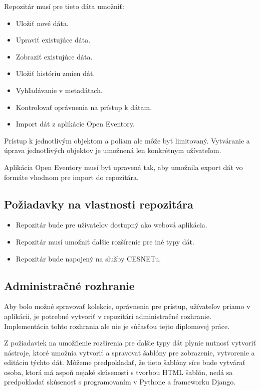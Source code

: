 \documentclass[thesis=M,slovak]{FITthesis}[2013/05/06]
\begin{document}
Repozitár musí pre tieto dáta umožniť:
\begin{itemize}
	\item Uložiť nové dáta.
	\item Upraviť existujúce dáta.
	\item Zobraziť existujúce dáta.
	\item Uložiť históriu zmien dát.
	\item Vyhľadávanie v metadátach.
	\item Kontrolovať oprávnenia na prístup k dátam.
	\item Import dát z aplikácie Open Eventory.
\end{itemize}

Prístup k jednotlivým objektom a poliam ale môže byť limitovaný. Vytváranie a úprava jednotlivých objektov je umožnená len konkrétnym užívateľom.

Aplikácia Open Eventory musí byť upravená tak, aby umožnila export dát vo formáte vhodnom pre import do repozitára.

\subsection{Požiadavky na vlastnosti repozitára}
\begin{itemize}
	\item Repozitár bude pre užívateľov dostupný ako webová aplikácia.
	\item Repozitár musí umožniť ďalšie rozšírenie pre iné typy dát.
	\item Repozitár bude napojený na služby CESNETu.
\end{itemize}

\subsection{Administračné rozhranie}
Aby bolo možné spravovať kolekcie, oprávnenia pre prístup, užívateľov priamo v aplikácii, je potrebné vytvoriť v repozitári administračné rozhranie. Implementácia tohto rozhrania ale nie je súčasťou tejto diplomovej práce.

Z požiadaviek na umožňenie rozšírenia pre ďalšie typy dát plynie nutnosť vytvoriť nástroje, ktoré umožnia vytvoriť a spravovať šablóny pre zobrazenie, vytvorenie a editáciu týchto dát. Môžeme predpokladať, že tieto šablóny síce bude vytvárať osoba, ktorá má aspoň nejaké skúsenosti s tvorbou HTML šablón, nedá sa predpokladať skúsenosť s programovaním v Pythone a frameworku Django. 
\end{document}
